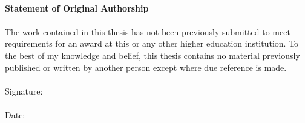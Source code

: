 




\newpage
~\\
\vfill

\textbf{Statement of Original Authorship} \\
~\\
The work contained in this thesis has not been previously submitted to meet requirements for an award at this or any other higher education institution. To the best of my knowledge and belief, this thesis contains no material previously published or written by another person except where due reference is made.\\
~\\
Signature:\\
~\\
Date:\\